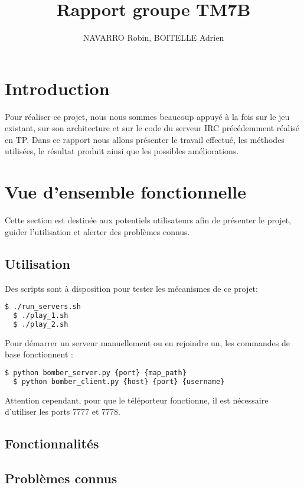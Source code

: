\documentclass[12pt]{article}
\title{Rapport groupe TM7B}
\author{NAVARRO Robin, BOITELLE Adrien}
\begin{document}
\maketitle

\newpage
\tableofcontents
\newpage

\section{Introduction}
Pour réaliser ce projet, nous nous sommes beaucoup appuyé à la fois sur le jeu existant, sur son architecture et sur le code du serveur IRC précédemment réalisé en TP. Dans ce rapport nous allons présenter le travail effectué, les méthodes utilisées, le résultat produit ainsi que les possibles améliorations.

\section{Vue d'ensemble fonctionnelle}

Cette section est destinée aux potentiels utilisateurs afin de présenter le projet, guider l'utilisation et alerter des problèmes connus.

\subsection{Utilisation}

Des scripts sont à disposition pour tester les mécanismes de ce projet:
\begin{lstlisting}[language=bash]
  $ ./run_servers.sh
  $ ./play_1.sh
  $ ./play_2.sh
\end{lstlisting}

Pour démarrer un serveur manuellement ou en rejoindre un, les commandes de base fonctionnent : 
\begin{lstlisting}[language=bash]
  $ python bomber_server.py {port} {map_path}
  $ python bomber_client.py {host} {port} {username}
\end{lstlisting}

Attention cependant, pour que le téléporteur fonctionne, il est nécessaire d'utiliser les ports 7777 et 7778.
\subsection{Fonctionnalités}

\subsection{Problèmes connus}
\newpage
\end{document}
